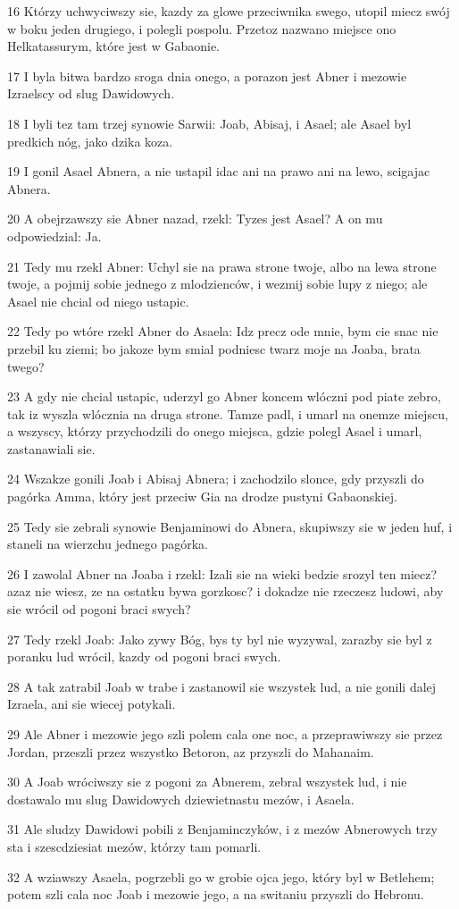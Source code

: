 \par 16 Którzy uchwyciwszy sie, kazdy za glowe przeciwnika swego, utopil miecz swój w boku jeden drugiego, i polegli pospolu. Przetoz nazwano miejsce ono Helkatassurym, które jest w Gabaonie.
\par 17 I byla bitwa bardzo sroga dnia onego, a porazon jest Abner i mezowie Izraelscy od slug Dawidowych.
\par 18 I byli tez tam trzej synowie Sarwii: Joab, Abisaj, i Asael; ale Asael byl predkich nóg, jako dzika koza.
\par 19 I gonil Asael Abnera, a nie ustapil idac ani na prawo ani na lewo, scigajac Abnera.
\par 20 A obejrzawszy sie Abner nazad, rzekl: Tyzes jest Asael? A on mu odpowiedzial: Ja.
\par 21 Tedy mu rzekl Abner: Uchyl sie na prawa strone twoje, albo na lewa strone twoje, a pojmij sobie jednego z mlodzienców, i wezmij sobie lupy z niego; ale Asael nie chcial od niego ustapic.
\par 22 Tedy po wtóre rzekl Abner do Asaela: Idz precz ode mnie, bym cie snac nie przebil ku ziemi; bo jakoze bym smial podniesc twarz moje na Joaba, brata twego?
\par 23 A gdy nie chcial ustapic, uderzyl go Abner koncem wlóczni pod piate zebro, tak iz wyszla wlócznia na druga strone. Tamze padl, i umarl na onemze miejscu, a wszyscy, którzy przychodzili do onego miejsca, gdzie polegl Asael i umarl, zastanawiali sie.
\par 24 Wszakze gonili Joab i Abisaj Abnera; i zachodzilo slonce, gdy przyszli do pagórka Amma, który jest przeciw Gia na drodze pustyni Gabaonskiej.
\par 25 Tedy sie zebrali synowie Benjaminowi do Abnera, skupiwszy sie w jeden huf, i staneli na wierzchu jednego pagórka.
\par 26 I zawolal Abner na Joaba i rzekl: Izali sie na wieki bedzie srozyl ten miecz? azaz nie wiesz, ze na ostatku bywa gorzkosc? i dokadze nie rzeczesz ludowi, aby sie wrócil od pogoni braci swych?
\par 27 Tedy rzekl Joab: Jako zywy Bóg, bys ty byl nie wyzywal, zarazby sie byl z poranku lud wrócil, kazdy od pogoni braci swych.
\par 28 A tak zatrabil Joab w trabe i zastanowil sie wszystek lud, a nie gonili dalej Izraela, ani sie wiecej potykali.
\par 29 Ale Abner i mezowie jego szli polem cala one noc, a przeprawiwszy sie przez Jordan, przeszli przez wszystko Betoron, az przyszli do Mahanaim.
\par 30 A Joab wróciwszy sie z pogoni za Abnerem, zebral wszystek lud, i nie dostawalo mu slug Dawidowych dziewietnastu mezów, i Asaela.
\par 31 Ale sludzy Dawidowi pobili z Benjaminczyków, i z mezów Abnerowych trzy sta i szescdziesiat mezów, którzy tam pomarli.
\par 32 A wziawszy Asaela, pogrzebli go w grobie ojca jego, który byl w Betlehem; potem szli cala noc Joab i mezowie jego, a na switaniu przyszli do Hebronu.

